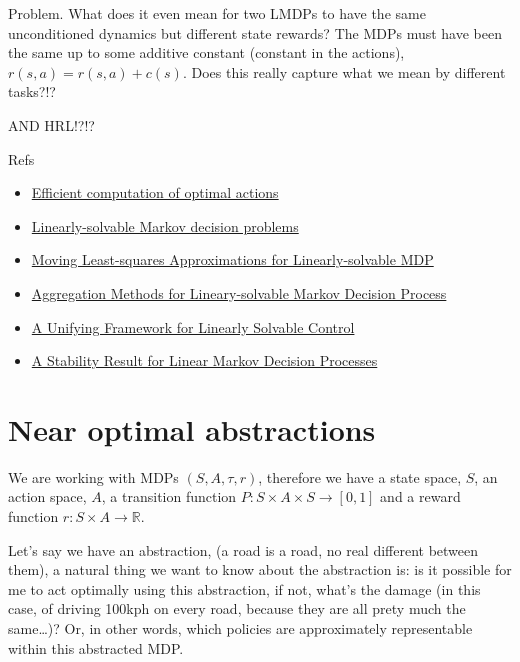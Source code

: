 Problem. What does it even mean for two LMDPs to have the same
unconditioned dynamics but different state rewards? The MDPs must have
been the same up to some additive constant (constant in the actions),
\(r(s, a)=r(s, a) + c(s)\). Does this really capture what we mean by
different tasks?!?

AND HRL!?!?

Refs

\begin{itemize}
\tightlist
\item
  \href{https://www.pnas.org/content/106/28/11478}{Efficient computation
  of optimal actions}
\item
  \href{https://homes.cs.washington.edu/~todorov/papers/TodorovNIPS06.pdf}{Linearly-solvable
  Markov decision problems}
\item
  \href{https://ieeexplore.ieee.org/stamp/stamp.jsp?arnumber=5967383}{Moving
  Least-squares Approximations for Linearly-solvable MDP}
\item
  \href{https://homes.cs.washington.edu/~todorov/papers/ZhongIFAC11.pdf}{Aggregation
  Methods for Lineary-solvable Markov Decision Process}
\item
  \href{https://arxiv.org/abs/1202.3715}{A Unifying Framework for
  Linearly Solvable Control}
\item
  \href{http://www.optimization-online.org/DB_FILE/2017/03/5893.pdf}{A
  Stability Result for Linear Markov Decision Processes}
\end{itemize}

\hypertarget{near-optimal-abstractions}{%
\section{Near optimal abstractions}\label{near-optimal-abstractions}}


We are working with MDPs \((S, A, \tau, r)\), therefore we have a state
space, \(S\), an action space, \(A\), a transition function
\(P: S\times A \times S \to [0, 1]\) and a reward function
\(r: S\times A \to \mathbb R\).

Let's say we have an abstraction, (a road is a road, no real different
between them), a natural thing we want to know about the abstraction is:
is it possible for me to act optimally using this abstraction, if not,
what's the damage (in this case, of driving 100kph on every road,
because they are all prety much the same\ldots{})? Or, in other words,
which policies are approximately representable within this abstracted
MDP.

